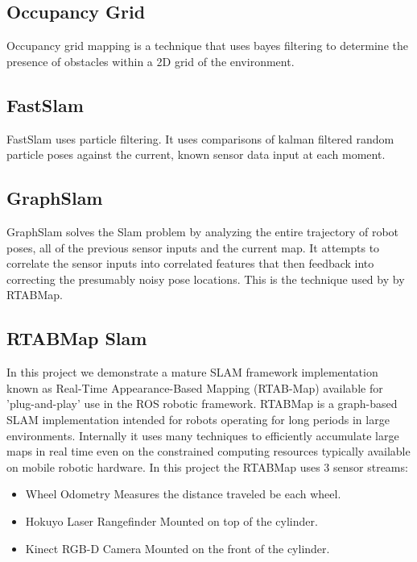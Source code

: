\documentclass[10pt,journal,compsoc]{IEEEtran}
\begin{document}
\subsection{Occupancy Grid}
Occupancy grid mapping is a technique that uses bayes filtering to determine the presence of obstacles within a 2D grid of the environment.

\subsection{FastSlam}
FastSlam uses particle filtering. It uses comparisons of kalman filtered random particle poses against the current, known sensor data input at each moment.

\subsection{GraphSlam}
GraphSlam solves the Slam problem by analyzing the entire trajectory of robot poses, all of the previous sensor inputs and the current map. It attempts to correlate the sensor inputs into correlated features that then feedback into correcting the  presumably noisy pose locations. This is the technique used by by RTABMap.

\subsection{RTABMap Slam}
In this project we demonstrate a mature SLAM framework implementation known as Real-Time Appearance-Based Mapping (RTAB-Map) available for 'plug-and-play' use in the ROS robotic framework. RTABMap is a graph-based SLAM implementation intended for robots operating for long periods in large environments. Internally it uses many techniques to efficiently accumulate large maps in real time even on the constrained computing resources typically available on mobile robotic hardware. In this project the RTABMap uses 3 sensor streams:

\begin{itemize}
 \item Wheel Odometry
 Measures the distance traveled be each wheel.
 \item Hokuyo Laser Rangefinder
 Mounted on top of the cylinder.
 \item Kinect RGB-D Camera
 Mounted on the front of the cylinder.
\end{itemize}
\end{document}

